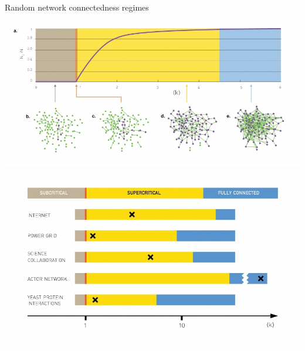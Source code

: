 \documentclass{beamer}
\begin{document}
\begin{frame}{Random network connectedness regimes}
  \centering
  \includegraphics[width=.6\textwidth]{Figures/randomRegimes.jpg} \\
  \includegraphics[width=.7\textwidth]{Figures/randomRegimeCompareRealworld.jpg}
\end{frame}
\end{document}

